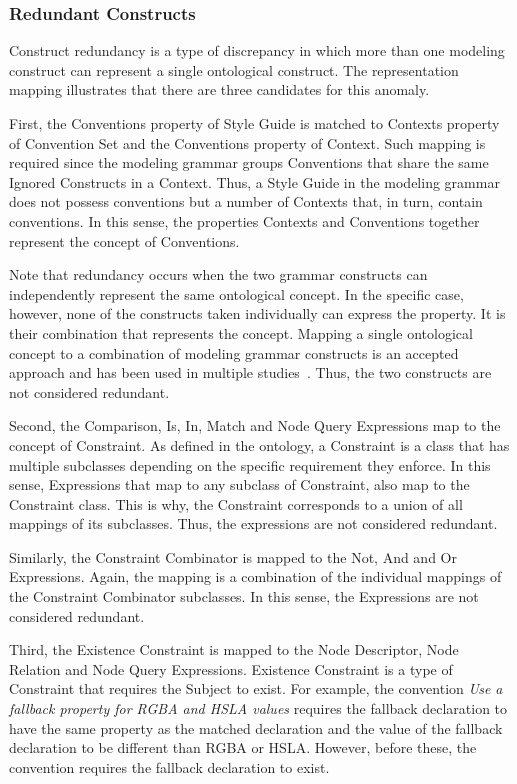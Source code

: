 \subsubsection{Redundant Constructs} 

Construct redundancy is a type of discrepancy in which more than one modeling
construct can represent a single ontological construct. The representation
mapping illustrates that there are three candidates for this anomaly.

First, the Conventions property of Style Guide is matched to Contexts property
of Convention Set and the Conventions property of Context. Such mapping is
required since the modeling grammar groups Conventions that share the same
Ignored Constructs in a Context. Thus, a Style Guide in the modeling grammar
does not possess conventions but a number of Contexts that, in turn, contain
conventions. In this sense, the properties Contexts and Conventions together
represent the concept of Conventions.

Note that redundancy occurs when the two grammar constructs can independently
represent the same ontological concept. In the specific case, however, none of
the constructs taken individually can express the property. It is their
combination that represents the concept. Mapping a single ontological concept
to a combination of modeling grammar constructs is an accepted approach and
has been used in multiple studies~\cite{gehlert2007toward}. Thus, the two
constructs are not considered redundant.

Second, the Comparison, Is, In, Match and Node Query Expressions map to the concept of Constraint.
As defined in the ontology, a Constraint is a class that has multiple subclasses depending on the
specific requirement they enforce. In this sense, Expressions that map to any subclass of
Constraint, also map to the Constraint class. This is why, the Constraint corresponds to a union of
all mappings of its subclasses. Thus, the expressions are not considered redundant.

Similarly, the Constraint Combinator is mapped to the Not, And and Or Expressions. Again, the
mapping is a combination of the individual mappings of the Constraint Combinator subclasses. In
this sense, the Expressions are not considered redundant.

Third, the Existence Constraint is mapped to the Node Descriptor, Node
Relation and Node Query Expressions. Existence Constraint is a type of
Constraint that requires the Subject to exist. For example, the convention
\textit{Use a fallback property for RGBA and HSLA values} requires the
fallback declaration to have the same property as the matched declaration and
the value of the fallback declaration to be different than RGBA or HSLA.
However, before these, the convention requires the fallback declaration to
exist.

